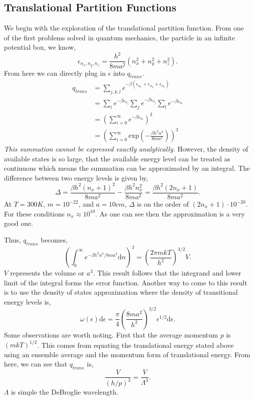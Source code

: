\subsection{Translational Partition Functions}
We begin with the exploration of the translational partition function. From one
of the first problems solved in quantum mechanics, the particle in an infinite
potential box, we know,
\begin{equation*}
	\epsilon_{n_x,n_y,n_z} = \frac{h^{2}}{8ma^{2}}(n_x^2 + n_y^2 + n_z^2).
\end{equation*}
From here we can directly plug in $\epsilon$ into $q_{trans}$.
\begin{align*}
	q_{trans} &= \sum_{j,k,l}{e^{-\beta (\epsilon_{n_x} + \epsilon_{n_y} +
	\epsilon_{n_z})}}\\
			  &= \sum_i{e^{-\beta \epsilon_{n_i}}} \sum_j{e^{-\beta
			  \epsilon_{n_j}}} \sum_l{e^{-\beta \epsilon_{n_l}}}\\
			  &= \left( \sum_{i=0}^{\infty}{e^{-\beta
			  \epsilon_{n_l}}}\right)^3\\
			  &= \left( \sum_{i=0}^{\infty}{\text{exp}\left(-\frac{\beta h^2
			  n^{2}}{8 m a^{2}}\right)}\right)^3
\end{align*}
\emph{This summation cannot be expressed exactly analytically.} However, the
density of available states is so large, that the available energy level can be
treated as continuous which means the summation can be approximated by an
integral. The difference between two energy levels is given by,
\begin{equation*}
	\Delta = \frac{\beta h^2 (n_x + 1)^2}{8ma^{2}} - \frac{\beta h^2
	n_x^{2}}{8ma^{2}} = \frac{\beta h^2 (2n_x + 1)}{8ma^{2}}.
\end{equation*}
At $T=300K$, $m=10^{-22}$, and $a=10cm$, $\Delta$ is on the order of $(2n_x + 1)
\cdot 10^{-20}$. For these conditions $n_x \approx 10^{10}$. As one can see then
the approximation is a very good one.

Thus, $q_{trans}$ becomes,
\begin{equation*}
	\left(\int_0^{\infty}{e^{-\beta h^2 n^2 / 8ma^{2}}\text{d}n}\right)^3 =
	\left(\frac{2\pi mkT}{h^{2}}\right)^{3/2} V.
\end{equation*}
$V$ represents the volume or $a^{3}$. This result follows that the integrand and
lower limit of the integral forms the error function. Another way to come to
this result is to use the density of states approximation where the density of
transitional energy levels is,
\begin{equation*}
	\omega(\epsilon)\text{d}\epsilon = \frac{\pi}{4}
	\left(\frac{8ma^{2}}{h^{2}}\right)^{3/2} \epsilon^{1/2}\text{d}\epsilon.
\end{equation*}
Some observations are worth noting. First that the average momentum $p$ is
$(mkT)^{1/2}$. This comes from equating the translational energy stated above
using an ensemble average and the momentum form of translational energy. From
here, we can see that $q_{trans}$ is,
\begin{equation*}
	\frac{V}{(h/p)^3} = \frac{V}{\Lambda^{3}}.
\end{equation*}
$\Lambda$ is simple the DeBroglie wavelength.

